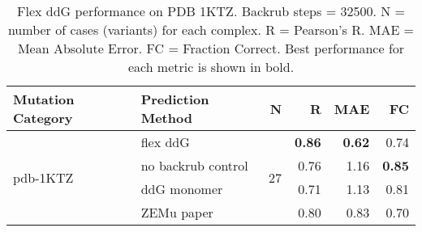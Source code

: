\begin{table}
  \begin{tabular}{llrrrr}
\toprule
Mutation Category &   Prediction Method &   N &    R &  MAE &   FC \\
\midrule
 \multirow{ 4}{*}{pdb-1KTZ} & flex ddG & \multirow{ 4}{*}{27} & \textbf{0.86} & \textbf{0.62} & 0.74  \\
 & no backrub control & & 0.76 & 1.16 & \textbf{0.85}  \\
 & ddG monomer & & 0.71 & 1.13 & 0.81  \\
 & ZEMu paper & & 0.80 & 0.83 & 0.70  \\
\bottomrule
\end{tabular}
  \caption[Flex ddG performance on PDB 1KTZ]{
    Flex ddG performance on PDB 1KTZ. Backrub steps = 32500. N = number of cases (variants) for each complex. R = Pearson's R. MAE = Mean Absolute Error. FC = Fraction Correct. Best performance for each metric is shown in bold.
  } \label{tab:table-pdb-1KTZ}
\end{table}
